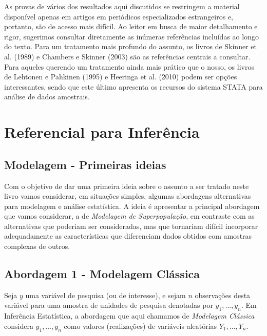 \documentclass[
  12pt,
  brazilian,
]{book}
\theoremstyle{definition}
\theoremstyle{definition}
\theoremstyle{definition}
\theoremstyle{definition}
\theoremstyle{remark}
\begin{document}
As provas de vários dos resultados aqui discutidos se restringem a material disponível apenas em artigos em periódicos especializados estrangeiros e, portanto, são de acesso mais difícil. Ao leitor em busca de maior detalhamento e rigor, sugerimos consultar diretamente as inúmeras referências incluídas ao longo do texto. Para um tratamento mais profundo do assunto, os livros de Skinner et al. (1989) e Chambers e Skinner (2003) são as referências centrais a consultar. Para aqueles querendo um tratamento ainda mais prático que o nosso, os livros de Lehtonen e Pahkinen (1995) e Heeringa et al. (2010) podem ser opções interessantes, sendo que este último apresenta os recursos do sistema STATA para análise de dados amostrais.

\hypertarget{refinf}{%
\chapter{Referencial para Inferência}\label{refinf}}

\hypertarget{modelagem---primeiras-ideias}{%
\section{Modelagem - Primeiras ideias}\label{modelagem---primeiras-ideias}}

Com o objetivo de dar uma primeira ideia sobre o assunto a ser tratado neste
livro vamos considerar, em situações simples, algumas abordagens alternativas
para modelagem e análise estatística. A ideia é apresentar a principal abordagem
que vamos considerar, a de \emph{Modelagem de Superpopulação}, em contraste com as
alternativas que poderiam ser consideradas, mas que tornariam difícil incorporar
adequadamente as características que diferenciam dados obtidos com amostras complexas de outros.

\hypertarget{classic}{%
\section{Abordagem 1 - Modelagem Clássica}\label{classic}}

Seja \(y\) uma variável de pesquisa (ou de interesse), e sejam \(n\) observações desta
variável para uma amostra de unidades de pesquisa denotadas por \(y_1, \ldots ,y_n\).
Em Inferência Estatística, a abordagem que aqui chamamos de \emph{Modelagem Clássica}\\
considera \(y_1, \ldots ,y_n\) como valores (realizações) de variáveis aleatórias \(Y_1, \ldots ,Y_n\).
\end{document}
